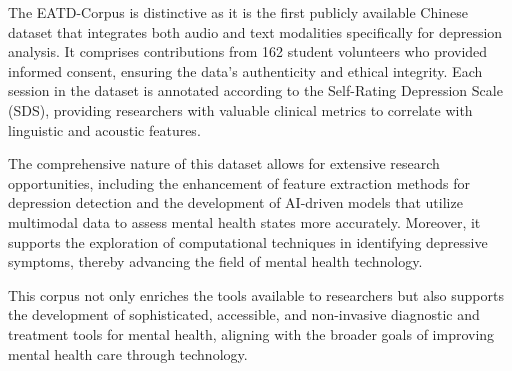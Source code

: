 The EATD-Corpus is distinctive as it is the first publicly available Chinese dataset that integrates both audio and text modalities specifically for depression analysis. It comprises contributions from 162 student volunteers who provided informed consent, ensuring the data's authenticity and ethical integrity. Each session in the dataset is annotated according to the Self-Rating Depression Scale (SDS)\cite{SDS}, providing researchers with valuable clinical metrics to correlate with linguistic and acoustic features.

The comprehensive nature of this dataset allows for extensive research opportunities, including the enhancement of feature extraction methods for depression detection and the development of AI-driven models that utilize multimodal data to assess mental health states more accurately. Moreover, it supports the exploration of computational techniques in identifying depressive symptoms, thereby advancing the field of mental health technology.

This corpus not only enriches the tools available to researchers but also supports the development of sophisticated, accessible, and non-invasive diagnostic and treatment tools for mental health, aligning with the broader goals of improving mental health care through technology.